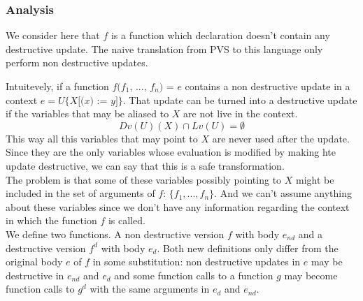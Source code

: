 \documentclass[12pt,a4paper]{article}
\newcommand{\cl}[1]{\texttt{#1}}
\newcommand{\ucont}[1]{\{#1\}}
\begin{document}
\subsubsection{Analysis}

We consider here that $f$ is a function which declaration doesn't contain any destructive update. The naive translation from PVS to this language only perform non destructive updates.

Intuitevely, if a function $f\cl{(}f_1\cl{, } ... \cl{, } f_n\cl{) = } e$ contains a non destructive update in a context $e = U\ucont{X\cl{[(}x\cl{) := }y\cl{]}}$. That update can be turned into a destructive update if the variables that may be aliased to $X$ are not live in the context.
$$ Dv(U)(X) \cap Lv(U) = \emptyset $$
This way all this variables that may point to $X$ are never used after the update. Since they are the only variables whose evaluation is modified by making hte update destructive, we can say that this is a safe transformation.\\

The problem is that some of these variables possibly pointing to $X$ might be included in the set of arguments of $f$: $\{f_1, ... , f_n\}$. And we can't assume anything about these variables since we don't have any information regarding the context in which the function $f$ is called.\\

We define two functions. A non destructive version $f$ with body $e_{nd}$ and a destructive version $f^d$ with body $e_d$.
Both new definitions only differ from the original body $e$ of $f$ in some substitution: non destructive updates in $e$ may be destructive in $e_{nd}$ and $e_d$ and some function calls to a function $g$ may become function calls to $g^d$ with the same arguments in $e_d$ and $e_{nd}$.\\
\end{document}
